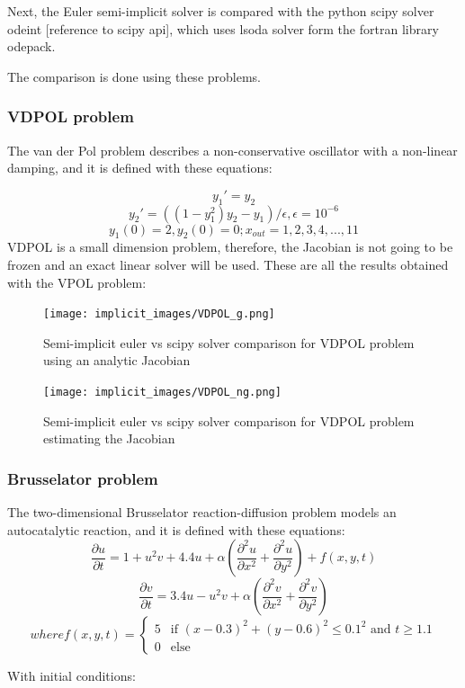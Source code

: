 \documentclass[12pt]{article}
\begin{document}
Next, the Euler semi-implicit solver is compared with the python scipy solver odeint [reference to scipy api], which uses lsoda solver form the fortran library odepack.

The comparison is done using these problems.

\subsubsection{VDPOL problem}
The van der Pol problem describes a non-conservative oscillator with a non-linear damping, and it is defined with these equations:

$$y_{1}' = y_{2}$$
$$y_{2}' = ((1-y_{1}^{2})y_{2}-y_{1})/\epsilon, \epsilon=10^{-6}$$
$$y_{1}(0)=2, y_{2}(0)=0; x_{out}=1,2,3,4,...,11$$
VDPOL is a small dimension problem, therefore, the Jacobian is not going to be frozen and an exact linear solver will be used. These are all the results obtained with the VPOL problem:

\begin{figure}[h]
 \texttt{[image: implicit\_images/VDPOL\_g.png]}
\centering
\caption{Semi-implicit euler vs scipy solver comparison for VDPOL problem using an analytic Jacobian}
\end{figure}

\begin{figure}[h]
 \texttt{[image: implicit\_images/VDPOL\_ng.png]}
\centering
\caption{Semi-implicit euler vs scipy solver comparison for VDPOL problem estimating the Jacobian}
\end{figure}

\subsubsection{Brusselator problem}
The two-dimensional Brusselator reaction-diffusion problem models an autocatalytic reaction, and it is defined with these equations:
$$\frac{\partial u}{\partial t} = 1+u^{2}v+4.4u+\alpha (\frac{\partial^{2} u}{\partial x^{2}}+\frac{\partial^{2} u}{\partial y^{2}})+f(x,y,t)$$
$$\frac{\partial v}{\partial t} = 3.4u-u^{2}v+\alpha (\frac{\partial^{2} v}{\partial x^{2}}+\frac{\partial^{2} v}{\partial y^{2}})$$
$$where f(x,y,t) = \begin{cases} 5 & \mbox{if } (x-0.3)^{2}+(y-0.6)^2\leq0.1^{2} \mbox{ and } t\geq1.1 \\ 0 & \mbox{else } \end{cases}$$

With initial conditions:
\end{document}
